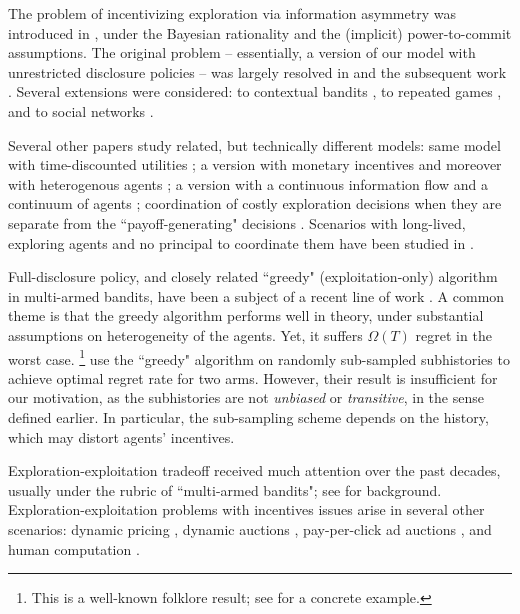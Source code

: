 The problem of incentivizing exploration via information asymmetry was introduced in \cite{Kremer-JPE14}, under the Bayesian rationality and the (implicit) power-to-commit assumptions. The original problem -- essentially, a version of our model with unrestricted disclosure policies -- was largely resolved in \cite{Kremer-JPE14} and the subsequent work \citep{ICexploration-ec15,ICexplorationGames-ec16}. Several extensions were considered: to contextual bandits \citep{ICexploration-ec15}, to repeated games
\citep{ICexplorationGames-ec16}, and to social networks \citep{Bahar-ec16}.

Several other papers study related, but technically different models: same model with time-discounted utilities \citep{Bimpikis-exploration-ms17}; a version with monetary incentives \citep{Frazier-ec14} and moreover with heterogenous agents \citep{Kempe-colt18}; a version with a continuous information flow and a continuum of agents \citep{Che-13}; coordination of costly exploration decisions when they are separate from the ``payoff-generating" decisions \citep{Bobby-Glen-ec16,Annie-ec18-traps,Liang-ec18}. Scenarios with long-lived, exploring agents and no principal to coordinate them have been studied in \citep{Bolton-econometrica99,Keller-econometrica05}.

Full-disclosure policy, and closely related ``greedy" (exploitation-only) algorithm in multi-armed bandits, have been a subject of a recent line of work \citep{Sven-aistats18,kannan2018smoothed,bastani2017exploiting,externalities-colt18}.
A common theme is that the greedy algorithm performs well in theory, under  substantial assumptions on heterogeneity of the agents. Yet, it suffers $\Omega(T)$ regret in the worst case.%
\footnote{This is a well-known folklore result; \eg see \citep{CompetingBandits-itcs18} for a concrete example.}
\citet{Baransi-ecml14} use the ``greedy" algorithm on randomly sub-sampled subhistories to achieve optimal regret rate for two arms. However, their result is insufficient for our motivation, as the subhistories are not \emph{unbiased} or \emph{transitive}, in the sense defined earlier. In particular, the sub-sampling scheme depends on the history, which may distort agents' incentives.

Exploration-exploitation tradeoff received much attention over the past decades, usually under the rubric of ``multi-armed bandits"; see  \citep{Bubeck-survey12,Gittins-book11} for background.
Exploration-exploitation problems with incentives issues arise in several other scenarios: dynamic pricing
    \citep{KleinbergL03,BZ09,BwK-focs13},
dynamic auctions
    \citep{AtheySegal-econometrica13,DynPivot-econometrica10,Kakade-pivot-or13},
pay-per-click ad auctions
    \citep{MechMAB-ec09,DevanurK09,Transform-ec10-jacm},
and human computation
    \citep{RepeatedPA-ec14,Ghosh-itcs13,Krause-www13}.
